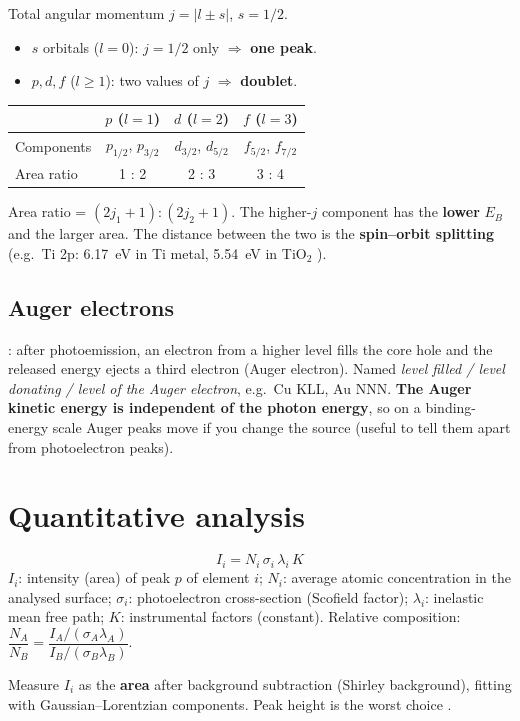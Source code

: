 \begin{keybox}
Total angular momentum $j = |l \pm s|$, $s = 1/2$.
\begin{itemize}
  \item $s$ orbitals ($l=0$): $j = 1/2$ only $\Rightarrow$ \textbf{one peak}.
  \item $p, d, f$ ($l\geq1$): two values of $j$ $\Rightarrow$ \textbf{doublet}.
\end{itemize}
\begin{center}
\begin{tabular}{@{}lccc@{}}
\toprule
 & $p$ ($l=1$) & $d$ ($l=2$) & $f$ ($l=3$) \\ \midrule
Components & $p_{1/2}$, $p_{3/2}$ & $d_{3/2}$, $d_{5/2}$ & $f_{5/2}$, $f_{7/2}$ \\
Area ratio & 1 : 2 & 2 : 3 & 3 : 4 \\
\bottomrule
\end{tabular}
\end{center}
Area ratio = $(2j_1+1):(2j_2+1)$. The higher-$j$ component has the \textbf{lower} $E_B$ and the larger area. The distance
between the two is the \textbf{spin--orbit splitting} (e.g.\ Ti 2p: \SI{6.17}{eV} in Ti metal, \SI{5.54}{eV} in TiO$_2$
).
\end{keybox}

\subsection{Auger electrons}
: after photoemission, an electron from a higher level fills the core hole and the released energy ejects
a third electron (Auger electron). Named \emph{level filled / level donating / level of the Auger electron}, e.g.\
Cu KLL, Au NNN. \textbf{The Auger kinetic energy is independent of the photon energy}, so on a binding-energy scale
Auger peaks move if you change the source (useful to tell them apart from photoelectron peaks).

\section{Quantitative analysis}
\begin{keybox}
\begin{equation}
I_i = N_i\,\sigma_i\,\lambda_i\,K
\end{equation}
$I_i$: intensity (area) of peak $p$ of element $i$; $N_i$: average atomic concentration in the analysed surface;
$\sigma_i$: photoelectron cross-section (Scofield factor); $\lambda_i$: inelastic mean free path; $K$: instrumental
factors (constant).
Relative composition: $\dfrac{N_A}{N_B} = \dfrac{I_A/(\sigma_A\lambda_A)}{I_B/(\sigma_B\lambda_B)}$.
\end{keybox}
Measure $I_i$ as the \textbf{area} after background subtraction (Shirley background), fitting with Gaussian--Lorentzian
components. Peak height is the worst choice \slide{154}.

